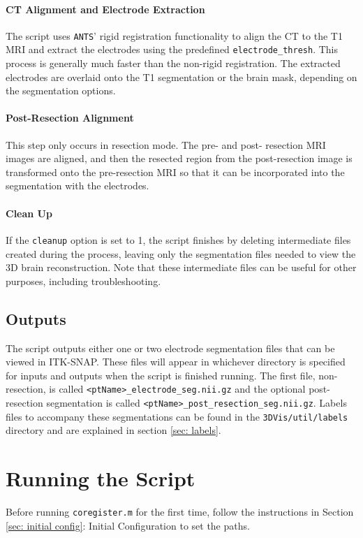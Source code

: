 \documentclass[12pt]{article}
\begin{document}
\paragraph{CT Alignment and Electrode Extraction} The script uses \texttt{ANTS}' rigid registration functionality to align the CT to the T1 MRI  and extract the electrodes using the predefined \texttt{electrode\_thresh}. This process is generally much faster than the non-rigid registration. The extracted electrodes are overlaid onto the T1 segmentation or the brain mask, depending on the segmentation options. 
\paragraph{Post-Resection Alignment} This step only occurs in resection mode. The pre- and post- resection MRI images are aligned, and then the resected region from the post-resection image is transformed onto the pre-resection MRI so that it can be incorporated into the segmentation with the electrodes. 
\paragraph{Clean Up} If the \texttt{cleanup} option is set to 1, the script finishes by deleting intermediate files created during the process, leaving only the segmentation files needed to view the 3D brain reconstruction. Note that these intermediate files can be useful for other purposes, including troubleshooting. 

\subsection{Outputs}
The script outputs either one or two electrode segmentation files that can be viewed in ITK-SNAP. These files will appear in whichever directory is specified for inputs and outputs when the script is finished running. The first file, non-resection, is called \texttt{<ptName>\_electrode\_seg.nii.gz} and the optional post-resection segmentation is called \texttt{<ptName>\_post\_resection\_seg.nii.gz}. Labels files to accompany these segmentations can be found in the \texttt{3DVis/util/labels} directory and are explained in section \ref{sec: labels}.

\section{Running the Script}
Before running \texttt{coregister.m} for the first time, follow the instructions in Section \ref{sec: initial config}: Initial Configuration to set the paths.
\end{document}
